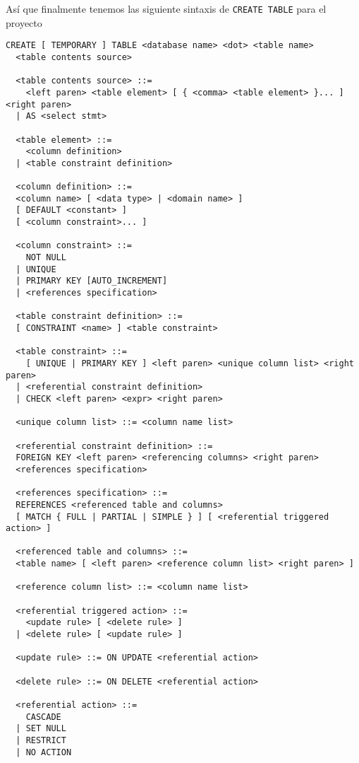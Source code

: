


Así que finalmente tenemos las siguiente sintaxis de \verb=CREATE TABLE= para el proyecto\\

\begin{Verbatim}[frame=single, label=sintaxis para CREATE TABLE]
  CREATE [ TEMPORARY ] TABLE <database name> <dot> <table name> 
  <table contents source>

  <table contents source> ::=
    <left paren> <table element> [ { <comma> <table element> }... ] <right paren>
  | AS <select stmt>
  
  <table element> ::=
    <column definition>
  | <table constraint definition>

  <column definition> ::=
  <column name> [ <data type> | <domain name> ]
  [ DEFAULT <constant> ]
  [ <column constraint>... ]
  
  <column constraint> ::=
    NOT NULL
  | UNIQUE
  | PRIMARY KEY [AUTO_INCREMENT]
  | <references specification>

  <table constraint definition> ::=
  [ CONSTRAINT <name> ] <table constraint>

  <table constraint> ::=
    [ UNIQUE | PRIMARY KEY ] <left paren> <unique column list> <right paren>
  | <referential constraint definition>
  | CHECK <left paren> <expr> <right paren>

  <unique column list> ::= <column name list>

  <referential constraint definition> ::=
  FOREIGN KEY <left paren> <referencing columns> <right paren>
  <references specification>
  
  <references specification> ::=
  REFERENCES <referenced table and columns>
  [ MATCH { FULL | PARTIAL | SIMPLE } ] [ <referential triggered action> ]

  <referenced table and columns> ::=
  <table name> [ <left paren> <reference column list> <right paren> ]

  <reference column list> ::= <column name list>

  <referential triggered action> ::=
    <update rule> [ <delete rule> ]
  | <delete rule> [ <update rule> ]

  <update rule> ::= ON UPDATE <referential action>

  <delete rule> ::= ON DELETE <referential action>

  <referential action> ::=
    CASCADE
  | SET NULL
  | RESTRICT
  | NO ACTION


\end{Verbatim}




